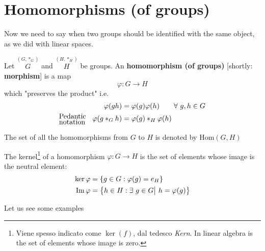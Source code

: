 \documentclass[../main.tex]{subfiles}
\begin{document}
\section[Homomorphisms]{Homomorphisms (of groups)}
Now we need to say when two groups should be identified with the same object, as we did with linear spaces.
\begin{definition}[Homomorphism]
Let $\overset{(G,\ast_G)}{G}$ and $\overset{(H,\ast_H)}{H}$ be groups. An \textbf{homomorphism (of groups)} [shortly: \textbf{morphism}] is a map
\[
\varphi: G \to H
\]
which "preserves the product" i.e.
\[
\begin{split}
    \varphi(gh)&=\varphi(g)\varphi(h) \qquad \forall \ g,h \in G\\
    \text{\parbox{1.3 cm}{\centering Pedantic \\[-4pt] notation}} \quad \varphi(g\ast_G h)&=\varphi(g)\ast_H \varphi(h)
\end{split}
\]
\end{definition}
\begin{kaobox}[frametitle=Notation]
The set of all the homomorphisms from $G$ to $H$ is denoted by $\textrm{Hom}(G,H)$
\end{kaobox}
\begin{definition}
The kernel\footnote{Viene spesso indicato come $\ker ( f )$, dal tedesco \textit{Kern}. In linear algebra is the set of elements whose image is zero.} of a homomorphism $\varphi: G\to H $ is the set of elements whose image is the neutral element:
\[
\begin{split}
\ker\varphi&=\Bqty{g\in G: \varphi(g) = e_H}\\
\Im\varphi&=\Bqty{h\in H: \exists \ g\in G \big| \ h=\varphi(g)}
\end{split}
\]
\end{definition}
Let us see some examples
\end{document}

